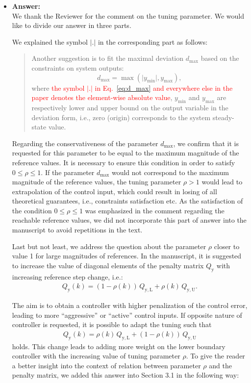 \documentclass[a4paper,10pt]{article}
\newcommand{\change}[1]{\textcolor{red}{#1}}
\newcommand{\answer}[1]{
	\begin{itemize}
		\item[] \textbf{Answer:}\\ #1
	\end{itemize}
}
\begin{document}
	\answer{
		We thank the Reviewer for the comment on the tuning parameter. We would like to divide our answer in three parts.
		
		We explained the symbol $\lvert.\rvert$ in the corresponding part as follows:
		
		\begin{quote}
			Another suggestion is to fit the maximal deviation $d_{\max}$ based on the constraints on system outputs: 
			\begin{equation} \tag{6}
				\label{eq:d_max}
				d_{\max} = \max(\vert y_{\min} \vert, y_{\max}),
			\end{equation}
			where \change{the symbol $\lvert.\rvert$ in Eq.~\eqref{eq:d_max} and everywhere else in the paper denotes the element-wise absolute value}, $y_{\min}$ and $y_{\max}$ are respectively lower and upper bound on the output variable in the deviation form, i.e., zero (origin) corresponds to the system steady-state value. 
		\end{quote}
	
		Regarding the conservativeness of the parameter $d_{\max}$, we confirm that it is requested for this parameter to be equal to the maximum magnitude of the reference values. It is necessary to ensure this condition in order to satisfy $0 \le \rho \le 1$. If the parameter $d_{\max}$ would not correspond to the maximum magnitude of the reference values, the tuning parameter $\rho > 1$ would lead to extrapolation of the control input, which could result in losing of all theoretical guarantees, i.e., constraints satisfaction etc. As the satisfaction of the condition $0 \le \rho \le 1$ was emphasized in the comment regarding the reachable reference values, we did not incorporate this part of answer into the manuscript to avoid repetitions in the text.
		
		Last but not least, we address the question about the parameter $\rho$ closer to value 1 for large magnitudes of references. 			
		In the manuscript, it is suggested to increase the value of diagonal elements of the penalty matrix $Q_\mathrm{y}$ with increasing reference step change, i.e.:		
		\begin{eqnarray*}
			Q_\mathrm{y}(k) = (1-\rho(k)) \, Q_\mathrm{y,L} + \rho(k) \, Q_\mathrm{y,U}.
		\end{eqnarray*}
			
		The aim is to obtain a controller with higher penalization of the control error, leading to more ``aggressive'' or ``active'' control inputs.
		If opposite nature of controller is requested, it is possible to adapt the tuning such that 
		\begin{eqnarray*}
			Q_\mathrm{y}(k) = \rho(k) \, Q_\mathrm{y,L} + (1-\rho(k)) \, Q_\mathrm{y,U}
		\end{eqnarray*}
		holds. This change leads to adding more weight on the lower boundary controller with the increasing value of tuning parameter $\rho$. To give the reader a better insight into the context of relation between parameter $\rho$ and the penalty matrix, we added this answer into Section 3.1 in the following way:
				
}
\end{document}
